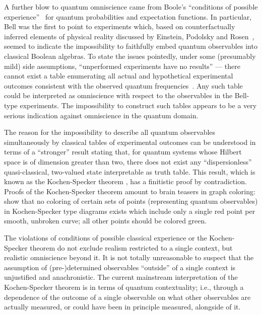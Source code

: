 \documentclass[rmp,amsfonts,showpacs,showkeys,twocolumn]{revtex4}
\begin{document}
A further blow to quantum omniscience came from Boole's
``conditions of possible experience''~\cite{Boole-62,Pit-94} for quantum probabilities and
expectation functions.
In particular, Bell was the first to point to experiments which,
based on counterfactually inferred elements of physical reality
discussed by Einstein, Podolsky and Rosen~\cite{epr},
seemed to indicate the impossibility
to faithfully embed quantum observables into classical Boolean algebras.
To state the issues pointedly, under some (presumably mild) side assumptions,
``unperformed experiments have no results''
\cite{peres222} --- there cannot exist a table enumerating all
actual and hypothetical experimental
outcomes consistent with the observed quantum frequencies~\cite{zeilinger-epr-98}.
Any such table could be interpreted as omniscience with respect to
the observables in the Bell-type experiments.
The impossibility to construct such tables appears to be a very serious indication against
omniscience in the quantum domain.

The reason for the impossibility to describe all quantum observables
simultaneously by classical tables of experimental outcomes
can be understood in terms of a ``stronger'' result stating that,
for quantum systems whose Hilbert space is of dimension greater than two,
there does not exist any ``dispersionless'' quasi-classical, two-valued state
interpretable as truth table.
This result, which is known as the Kochen-Specker theorem
\cite{specker-60,kochen1,ZirlSchl-65,Alda,Alda2,kamber64,kamber65,svozil-tkadlec,cabello-96},
has a finitistic proof by contradiction.
Proofs of the Kochen-Specker theorem  amount to  brain teasers in graph coloring:
show that no coloring of certain sets of points (representing quantum observables) in Kochen-Specker type
diagrams exists which include only a single red point
per smooth, unbroken curve; all other points should be colored green.


The violations of conditions of possible classical experience or
the Kochen-Specker theorem do not exclude realism restricted to a single context,
but realistic omniscience beyond it.
It is not totally unreasonable to suspect that the assumption of \mbox{(pre-)determined} observables ``outside''
of a single context is unjustified and anachronistic. The current mainstream interpretation
of the Kochen-Specker theorem is in terms of quantum contextuality; i.e., through a dependence of the outcome
of a single observable on what other observables are actually measured, or could have been in principle measured, alongside of it.
\end{document}

